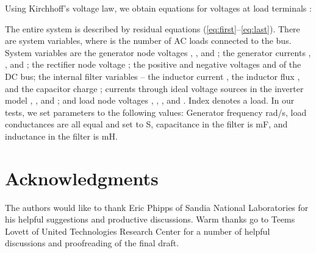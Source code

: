\documentclass[10pt]{ijnam}
\theoremstyle{definition}
\begin{document}
Using Kirchhoff's voltage law, we obtain equations for voltages at load 
terminals :


The entire system is described by residual equations 
(\ref{eq:first}--\ref{eq:last}). There are  system variables, 
where  is the number of AC loads connected to the bus. System variables 
are the generator node voltages , , and ; the generator 
currents , , and ; the rectifier node voltage ;
the positive and negative voltages  and  of the DC bus; the internal filter
variables -- the inductor current , the inductor flux , and the capacitor
charge ; currents through ideal voltage sources in the inverter
model , , and ; and load node 
voltages , , , and .
Index  denotes a load. In our tests, we set parameters to 
the following values: Generator frequency rad/s, load 
conductances are all equal and set to S, capacitance in the filter 
is mF, and inductance in the filter is mH. 

\section*{Acknowledgments}
The authors would like to thank Eric Phipps of Sandia National Laboratories 
for his helpful suggestions and productive discussions. Warm thanks go to 
Teems Lovett of United Technologies Research Center
for a number of helpful discussions and proofreading of the final draft. 



\end{document}
